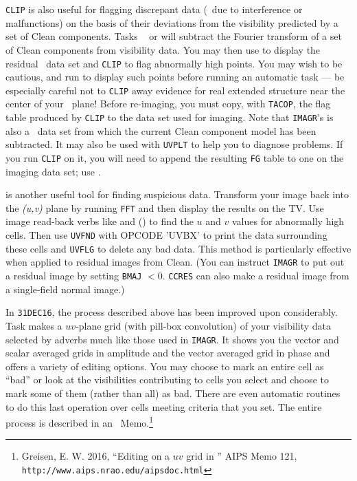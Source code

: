      {\tt CLIP} is also useful for flagging discrepant data (\eg\ due
to interference or malfunctions) on the basis of their deviations from
the visibility predicted by a set of Clean components.  Tasks {\tt
{}} or {\tt {}} will subtract the Fourier
transform of a set of Clean components from visibility data.  You may
then use {\tt {}} to display the residual \uv\ data set and
{\tt CLIP} to flag abnormally high points.  You may wish to be
cautious, and run {\tt {}} to display such points before
running an automatic {\tt {}} task --- be especially careful
not to {\tt CLIP} away evidence for real extended structure near the
center of your \uv\ plane!  Before re-imaging, you must copy, with
{\tt TACOP}, the flag table produced by {\tt CLIP} to the data set
used for imaging.  Note that {\tt IMAGR}'s  is also a
\uv\ data set from which the current Clean component model has been
subtracted.  It may also be used with {\tt UVPLT} to help you to
diagnose problems.  If you run {\tt CLIP} on it, you will need to
append the resulting {\tt FG} table to one on the imaging data set;
use {\tt {}}\@.

     {\tt {}} is another useful tool for finding suspicious
data. Transform your image back into the {\it (u,v)\/} plane by running
{\tt FFT} and then display the results on the TV\@.  Use image
read-back verbs like {\tt {}} and {\tt {}}
() to find the $u$ and $v$ values for abnormally high
cells.  Then use {\tt UVFND} with {\us OPCODE 'UVBX'} to print the
data surrounding these cells and {\tt UVFLG} to delete any bad data.
This method is particularly effective when applied to residual images
from Clean.  (You can instruct {\tt IMAGR} to put out a residual image
by setting {\tt BMAJ} $<$0.  {\tt CCRES} can also make a residual
image from a single-field normal image.)

     In {\tt 31DEC16}, the process described above has been improved
upon considerably.  Task {\tt {}} makes a $uv$-plane grid
(with pill-box convolution) of your visibility data selected by adverbs
much like those used in {\tt IMAGR}\@.  It shows you the vector and
scalar averaged grids in amplitude and the vector averaged grid in
phase and offers a variety of editing options.  You may choose to mark
an entire cell as ``bad'' or look at the visibilities contributing to
cells you select and choose to mark some of them (rather than all) as
bad.  There are even automatic routines to do this last operation over
cells meeting criteria that you set.  The entire process is described
in an \AIPS\ Memo.\footnote{Greisen, E. W. 2016, ``Editing on a $uv$
grid in \AIPS'' AIPS Memo 121, {\tt
http://www.aips.nrao.edu/aipsdoc.html}}

